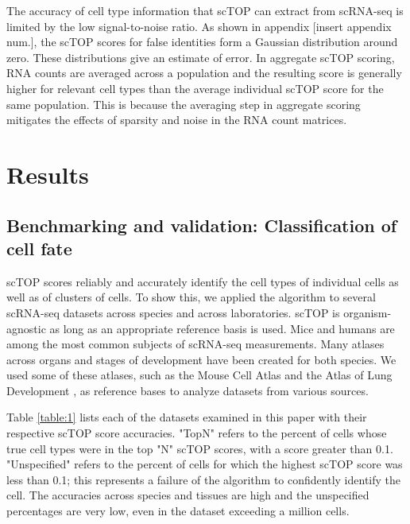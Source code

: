 \documentclass[aps,superscriptaddress, notitlepage,longbibliography]{revtex4-1}
\begin{document}
The accuracy of cell type information that scTOP can extract from scRNA-seq is limited by the low signal-to-noise ratio. As shown in appendix [insert appendix num.], the scTOP scores for false identities form a Gaussian distribution around zero. These distributions give an estimate of error. In aggregate scTOP scoring, RNA counts are averaged across a population and the resulting score is generally higher for relevant cell types than the average individual scTOP score for the same population. This is because the averaging step in aggregate scoring mitigates the effects of sparsity and noise in the RNA count matrices.

\section{Results}

\subsection{Benchmarking and validation: Classification of cell fate}
scTOP scores reliably and accurately identify the cell types of individual cells as well as of clusters of cells. To show this, we applied the algorithm to several scRNA-seq datasets across species and across laboratories. scTOP is organism-agnostic as long as an appropriate reference basis is used. Mice and humans are among the most common subjects of scRNA-seq measurements. Many atlases across organs and stages of development have been created for both species. We used some of these atlases, such as the Mouse Cell Atlas \cite{noauthor_mapping_nodate} and the Atlas of Lung Development \cite{negretti_single-cell_2021}, as reference bases to analyze datasets from various sources.

Table \ref{table:1} lists each of the datasets examined in this paper with their respective scTOP score accuracies. "TopN" refers to the percent of cells whose true cell types were in the top "N" scTOP scores, with a score greater than 0.1. "Unspecified" refers to the percent of cells for which the highest scTOP score was less than 0.1; this represents a failure of the algorithm to confidently identify the cell. The accuracies across species and tissues are high and the unspecified percentages are very low, even in the dataset exceeding a million cells.
\end{document}
